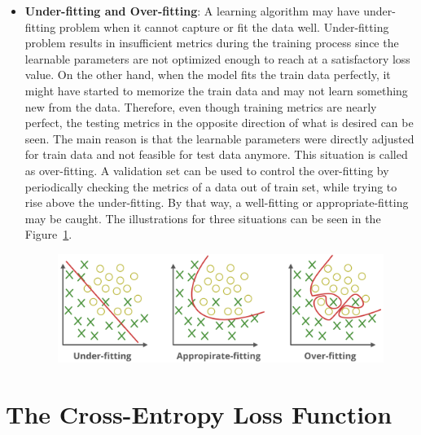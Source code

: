 \begin{itemize}
\item \textbf{Under-fitting and Over-fitting}: A learning algorithm may have under-fitting problem when it cannot capture or fit the data well. Under-fitting problem results in insufficient metrics during the training process since the learnable parameters are not optimized enough to reach at a satisfactory loss value. On the other hand, when the model fits the train data perfectly, it might have started to memorize the train data and may not learn something new from the data. Therefore, even though training metrics are nearly perfect, the testing metrics in the opposite direction of what is desired can be seen. The main reason is that the learnable parameters were directly adjusted for train data and not feasible for test data anymore. This situation is called as over-fitting. A validation set can be used to control the over-fitting by periodically checking the metrics of a data out of train set, while trying to rise above the under-fitting. By that way, a well-fitting or appropriate-fitting may be caught. The illustrations for three situations can be seen in the Figure~\ref{fig:underfitting_overfitting}.

\begin{figure}[h]
\centering
\includegraphics[width=1\linewidth]{fig/underfitting_overfitting.png}
\vspace*{1mm}
\label{fig:underfitting_overfitting}
\end{figure}

\end{itemize}

\section{The Cross-Entropy Loss Function}\label{sec:CH3_cross_entropy}

